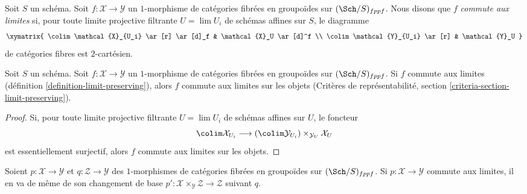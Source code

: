 \begin{definition}
\label{definition-limit-preserving}
Soit $S$ un schéma. Soit $f : \mathcal{X} \to \mathcal{Y}$ un
$1$-morphisme de catégories fibrées en groupoïdes sur $(\Sch/S)_{fppf}$.
Nous disons que $f$ {\it commute aux limites} si, pour toute limite projective
filtrante $U = \lim U_i$ de schémas affines sur $S$, le diagramme
$$
\xymatrix{
\colim \mathcal{X}_{U_i} \ar[r] \ar[d]_f & \mathcal{X}_U \ar[d]^f \\
\colim \mathcal{Y}_{U_i} \ar[r] & \mathcal{Y}_U
}
$$
de catégories fibres est $2$-cartésien.
\end{definition}

\begin{lemma}
\label{lemma-limit-preserving-objects}
Soit $S$ un schéma. Soit $f : \mathcal{X} \to \mathcal{Y}$ un
$1$-morphisme de catégories fibrées en groupoïdes sur $(\Sch/S)_{fppf}$.
Si $f$ commute aux limites (définition \ref{definition-limit-preserving}),
alors $f$ commute aux limites sur les objets (Critères de représentabilité,
section \ref{criteria-section-limit-preserving}).
\end{lemma}

\begin{proof}
Si, pour toute limite projective filtrante $U = \lim U_i$ de schémas affines
sur $U$, le foncteur
$$
\colim \mathcal{X}_{U_i} \longrightarrow
(\colim \mathcal{Y}_{U_i}) \times_{\mathcal{Y}_U} \mathcal{X}_U
$$
est essentiellement surjectif, alors $f$ commute aux limites sur les objets.
\end{proof}

\begin{lemma}
\label{lemma-base-change-limit-preserving}
Soient $p : \mathcal{X} \to \mathcal{Y}$ et
$q : \mathcal{Z} \to \mathcal{Y}$ des $1$-morphismes de catégories fibrées
en groupoïdes sur $(\Sch/S)_{fppf}$. Si
$p : \mathcal{X} \to \mathcal{Y}$ commute aux limites, il en va de même de
son changement de base
$p' : \mathcal{X} \times_\mathcal{Y} \mathcal{Z} \to \mathcal{Z}$
suivant $q$.
\end{lemma}

